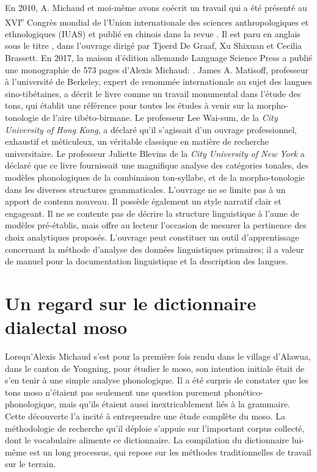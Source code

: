 En 2010, A. Michaud et moi-même avons coécrit un travail qui a été présenté au XVI\textsuperscript{e} Congrès mondial de l'Union internationale des sciences anthropologiques et ethnologiques (IUAS) et publié en chinois dans la revue . Il est paru en anglais sous le titre , dans l’ouvrage \emph{} dirigé par Tjeerd De Graaf, Xu Shixuan et Cecilia Brassett. En 2017, la maison d'édition allemande Language Science Press a publié une monographie de 573 pages d’Alexis Michaud: \emph{}. James A. Matisoff, professeur à l'université de Berkeley, expert de renommée internationale au sujet des langues sino-tibétaines, a décrit le livre comme un travail monumental dans l'étude des tons, qui établit une référence pour toutes les études à venir sur la morpho-tonologie de l’aire tibéto-birmane. Le professeur Lee Wai-sum, de la \emph{City University of Hong Kong}, a déclaré qu'il s'agissait d'un ouvrage professionnel, exhaustif et méticuleux, un véritable classique en matière de recherche universitaire. Le professeur Juliette Blevins de la \emph{City University of New York} a déclaré que ce livre fournissait une magnifique analyse des catégories tonales, des modèles phonologiques de la combinaison ton-syllabe, et de la morpho-tonologie dans les diverses structures grammaticales. L’ouvrage ne se limite pas à un apport de contenu nouveau. Il possède également un style narratif clair et engageant. Il ne se contente pas de décrire la structure linguistique à l’aune de modèles pré-établis, mais offre au lecteur l’occasion de mesurer la pertinence des choix analytiques proposés. L'ouvrage peut constituer un outil d'apprentissage concernant la méthode d’analyse des données linguistiques primaires; il a valeur de manuel pour la documentation linguistique et la description des langues.

\section*{Un regard sur le dictionnaire dialectal moso}

Lorsqu’Alexis Michaud s'est pour la première fois rendu dans le village d'Alawua, dans le canton de Yongning, pour étudier le moso, son intention initiale était de s’en tenir à une simple analyse phonologique. Il a été surpris de constater que les tons moso n'étaient pas seulement une question purement phonético-phonologique, mais qu'ils étaient aussi inextricablement liés à la grammaire. Cette découverte l'a incité à entreprendre une étude complète du moso. La méthodologie de recherche qu’il déploie s’appuie sur l’important corpus collecté, dont le vocabulaire alimente ce dictionnaire. La compilation du dictionnaire lui-même est un long processus, qui repose sur les méthodes traditionnelles de travail sur le terrain.

